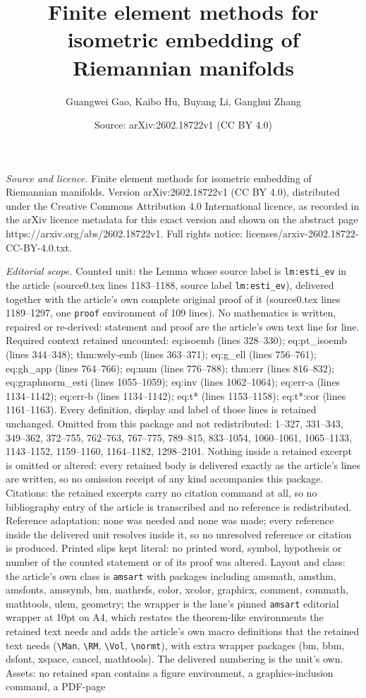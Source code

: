 \documentclass[10pt,a4paper]{amsart}
\title[Finite element methods for isometric embedding of Riemannian]{Finite element methods for isometric embedding of Riemannian manifolds}
\author{Guangwei Gao, Kaibo Hu, Buyang Li, Ganghui Zhang}
\date{Source: arXiv:2602.18722v1 (CC BY 4.0)}
\begin{document}
\maketitle

\noindent\emph{Source and licence.} Finite element methods for isometric embedding of Riemannian manifolds. Version arXiv:2602.18722v1 (CC BY 4.0), distributed under the Creative Commons Attribution 4.0 International licence, as recorded in the arXiv licence metadata for this exact version and shown on the abstract page https://arxiv.org/abs/2602.18722v1. Full rights notice: licenses/arxiv-2602.18722-CC-BY-4.0.txt.\par\smallskip

\noindent\textit{Editorial scope.} Counted unit: the Lemma whose source label is \texttt{lm:esti\_ev} in the article (source0.tex lines 1183--1188, source label \texttt{lm:esti\_ev}), delivered together with the article's own complete original proof of it (source0.tex lines 1189--1297, one \texttt{proof} environment of 109 lines). No mathematics is written, repaired or re-derived: statement and proof are the article's own text line for line. Required context retained uncounted: eq:isoemb (lines 328--330); eq:pt\_isoemb (lines 344--348); thm:wely-emb (lines 363--371); eq:g\_ell (lines 756--761); eq:gh\_app (lines 764--766); eq:num (lines 776--788); thm:err (lines 816--832); eq:graphnorm\_esti (lines 1055--1059); eq:inv (lines 1062--1064); eq:err-a (lines 1134--1142); eq:err-b (lines 1134--1142); eq:t* (lines 1153--1158); eq:t*:cor (lines 1161--1163). Every definition, display and label of those lines is retained unchanged. Omitted from this package and not redistributed: 1--327, 331--343, 349--362, 372--755, 762--763, 767--775, 789--815, 833--1054, 1060--1061, 1065--1133, 1143--1152, 1159--1160, 1164--1182, 1298--2101. Nothing inside a retained excerpt is omitted or altered: every retained body is delivered exactly as the article's lines are written, so no omission receipt of any kind accompanies this package. Citations: the retained excerpts carry no citation command at all, so no bibliography entry of the article is transcribed and no reference is redistributed. Reference adaptation: none was needed and none was made; every reference inside the delivered unit resolves inside it, so no unresolved reference or citation is produced. Printed slips kept literal: no printed word, symbol, hypothesis or number of the counted statement or of its proof was altered. Layout and class: the article's own class is \texttt{amsart} with packages including amsmath, amsthm, amsfonts, amssymb, bm, mathrsfs, color, xcolor, graphicx, comment, commath, mathtools, ulem, geometry; the wrapper is the lane's pinned \texttt{amsart} editorial wrapper at 10pt on A4, which restates the theorem-like environments the retained text needs and adds the article's own macro definitions that the retained text needs (\texttt{\textbackslash Man}, \texttt{\textbackslash RM}, \texttt{\textbackslash Vol}, \texttt{\textbackslash normt}), with extra wrapper packages (bm, bbm, dsfont, xspace, cancel, mathtools). The delivered numbering is the unit's own. Assets: no retained span contains a figure environment, a graphics-inclusion command, a PDF-page 
\end{document}
